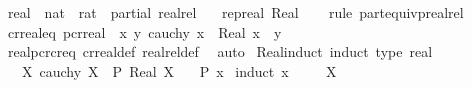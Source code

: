 \begin{isabellebody}
\endisatagproof
{\isafoldproof}%
%
\isadelimproof
%
\endisadelimproof
%
\isadelimdocument
%
\endisadelimdocument
%
\isatagdocument
%
\isamarkuptrue%
%
\endisatagdocument
{\isafolddocument}%
%
\isadelimdocument
%
\endisadelimdocument
{}\isamarkupfalse%
\ real\ {\isacharequal}{\kern0pt}\ {\isachardoublequoteopen}nat\ {\isasymRightarrow}\ rat{\isachardoublequoteclose}\ {\isacharslash}{\kern0pt}\ partial{\isacharcolon}{\kern0pt}\ realrel\isanewline
\ \ \ rep{\isacharunderscore}{\kern0pt}real\ Real\isanewline
%
\isadelimproof
\ \ %
\endisadelimproof
%
\isatagproof
{}\isamarkupfalse%
\ {\isacharparenleft}{\kern0pt}rule\ part{\isacharunderscore}{\kern0pt}equivp{\isacharunderscore}{\kern0pt}realrel{\isacharparenright}{\kern0pt}%
\endisatagproof
{\isafoldproof}%
%
\isadelimproof
\isanewline
%
\endisadelimproof
\isanewline
{}\isamarkupfalse%
\ cr{\isacharunderscore}{\kern0pt}real{\isacharunderscore}{\kern0pt}eq{\isacharcolon}{\kern0pt}\ {\isachardoublequoteopen}pcr{\isacharunderscore}{\kern0pt}real\ {\isacharequal}{\kern0pt}\ {\isacharparenleft}{\kern0pt}{\isasymlambda}x\ y{\isachardot}{\kern0pt}\ cauchy\ x\ {\isasymand}\ Real\ x\ {\isacharequal}{\kern0pt}\ y{\isacharparenright}{\kern0pt}{\isachardoublequoteclose}\isanewline
%
\isadelimproof
\ \ %
\endisadelimproof
%
\isatagproof
{}\isamarkupfalse%
\ real{\isachardot}{\kern0pt}pcr{\isacharunderscore}{\kern0pt}cr{\isacharunderscore}{\kern0pt}eq\ cr{\isacharunderscore}{\kern0pt}real{\isacharunderscore}{\kern0pt}def\ realrel{\isacharunderscore}{\kern0pt}def\ \isamarkupfalse%
\ auto%
\endisatagproof
{\isafoldproof}%
%
\isadelimproof
\isanewline
%
\endisadelimproof
\isanewline
{}\isamarkupfalse%
\ Real{\isacharunderscore}{\kern0pt}induct\ {\isacharbrackleft}{\kern0pt}induct\ type{\isacharcolon}{\kern0pt}\ real{\isacharbrackright}{\kern0pt}{\isacharcolon}{\kern0pt}\ \isanewline
\ \ \ {\isachardoublequoteopen}{\isasymAnd}X{\isachardot}{\kern0pt}\ cauchy\ X\ {\isasymLongrightarrow}\ P\ {\isacharparenleft}{\kern0pt}Real\ X{\isacharparenright}{\kern0pt}{\isachardoublequoteclose}\isanewline
\ \ \ {\isachardoublequoteopen}P\ x{\isachardoublequoteclose}\isanewline
%
\isadelimproof
%
\endisadelimproof
%
\isatagproof
{}\isamarkupfalse%
\ {\isacharparenleft}{\kern0pt}induct\ x{\isacharparenright}{\kern0pt}\isanewline
\ \ \isamarkupfalse%
\ {\isacharparenleft}{\kern0pt}{}\ X{\isacharparenright}{\kern0pt}\isanewline

\end{isabellebody}
